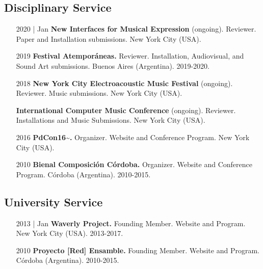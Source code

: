 \documentclass[12pt]{article}%
\begin{document}
\subsection{Disciplinary Service}%
\begin{itemize}[align=parleft,leftmargin=2.25cm,labelwidth=2cm]
\item[2020 | Jan]
\textbf{New Interfaces for Musical Expression}
(ongoing). 
Reviewer. 
Paper and Installation submissions. 
New York City (USA). 
\end{itemize}%
\begin{itemize}[align=parleft,leftmargin=2.25cm,labelwidth=2cm]
\item[2019]
\textbf{Festival Atemporáneas.}
Reviewer. 
Installation, Audiovisual, and Sound Art submissions. 
Buenos Aires (Argentina). 
2019{-}2020.
\end{itemize}%
\begin{itemize}[align=parleft,leftmargin=2.25cm,labelwidth=2cm]
\item[2018]
\textbf{New York City Electroacoustic Music Festival}
(ongoing). 
Reviewer. 
Music submissions. 
New York City (USA). 
\end{itemize}%
\begin{itemize}[align=parleft,leftmargin=2.25cm,labelwidth=2cm]
\item[]
\textbf{International Computer Music Conference}
(ongoing). 
Reviewer. 
Installations and Music Submissions. 
New York City (USA). 
\end{itemize}%
\begin{itemize}[align=parleft,leftmargin=2.25cm,labelwidth=2cm]
\item[2016]
\textbf{PdCon16\textasciitilde{}.}
Organizer. 
Website and Conference Program. 
New York City (USA). 
\end{itemize}%
\begin{itemize}[align=parleft,leftmargin=2.25cm,labelwidth=2cm]
\item[2010]
\textbf{Bienal Composición Córdoba.}
Organizer. 
Website and Conference Program. 
Córdoba (Argentina). 
2010{-}2015.
\end{itemize}%
\subsection{University Service}%
\begin{itemize}[align=parleft,leftmargin=2.25cm,labelwidth=2cm]
\item[2013 | Jan]
\textbf{Waverly Project.}
Founding Member. 
Website and Program. 
New York City (USA). 
2013{-}2017.
\end{itemize}%
\begin{itemize}[align=parleft,leftmargin=2.25cm,labelwidth=2cm]
\item[2010]
\textbf{Proyecto {[}Red{]} Ensamble.}
Founding Member. 
Website and Program. 
Córdoba (Argentina). 
2010{-}2015.
\end{itemize}
\end{document}

